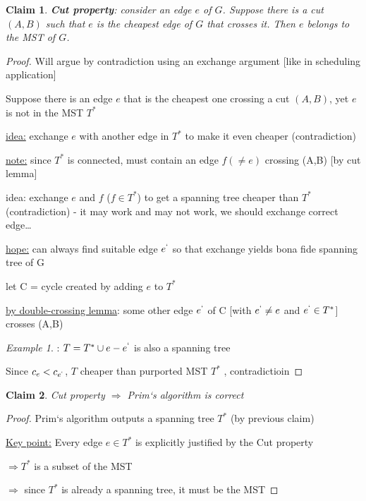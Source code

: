 \documentclass[a4paper,12pt]{article}
\theoremstyle{plain}
\newtheorem{claim}{Claim}
\theoremstyle{definition}
\theoremstyle{remark}
\newtheorem*{example}{Example}
\begin{document}
\begin{claim}
\textbf{Cut property}: consider an edge $e$ of $G$. Suppose there is a cut $(A,B)$ such that $e$ is the cheapest edge of $G$ that crosses it. Then $e$ belongs to the MST of $G$.
\end{claim}
\begin{proof}
Will argue by contradiction using an exchange argument [like in scheduling application]

Suppose there is an edge $e$ that is the cheapest one crossing a cut $(A,B)$, yet $e$ is not in the MST $T^*$

\underline{idea:} exchange $e$ with another edge in $T^*$ to make it even cheaper (contradiction)

\underline{note:} since $T^*$ is connected, must contain an edge $f (\neq e)$ crossing (A,B) [by cut lemma]

idea: exchange $e$ and $f$ ($f \in T^*$) to get a spanning tree cheaper than $T^*$ (contradiction) - it may work and may not work, we should exchange correct edge\dots

\underline{hope:} can always find suitable edge $e^`$ so that exchange yields bona fide spanning tree of G

let C = cycle created by adding $e$ to $T^*$

\underline{by double-crossing lemma}: some other edge $e^`$ of C [with $e^` \neq e$ and $e^` \in T^*$] crosses (A,B)

\begin{example}: $T = T^* \cup {e} - {e^`}$ is also a spanning tree\end{example}

Since $c_e < c_{e^`}$, $T$ cheaper than purported MST $T^*$	, contradictioin
\end{proof}

\begin{claim} Cut property $\Rightarrow$ Prim`s algorithm is correct\end{claim}
\begin{proof}
Prim`s algorithm outputs a spanning tree $T^*$ (by previous claim)

\underline{Key point:} Every edge $e \in T^*$ is explicitly justified by the Cut property

$\Rightarrow T^*$ is a subset of the MST

$\Rightarrow$ since $T^*$ is already a spanning tree, it must be the MST
\end{proof}
\end{document}
